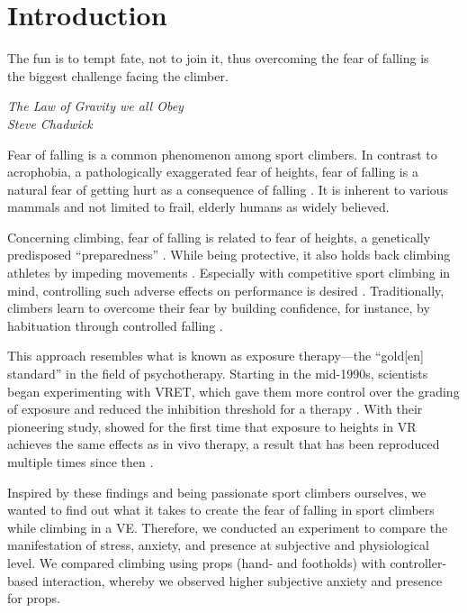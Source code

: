 \section{Introduction}

\epigraph{The fun is to tempt fate, not to join it, thus overcoming the fear of falling is\\the biggest challenge facing the climber.}{\textit{The Law of Gravity we all Obey\\Steve Chadwick}}

Fear of falling is a common phenomenon among sport climbers. In contrast to acrophobia, a pathologically exaggerated fear of heights, fear of falling is a natural fear of getting hurt as a consequence of falling \autocite{Legters2002}. It is inherent to various mammals \autocite{Gibson1960} and not limited to frail, elderly humans \autocite{Suzuki2002} as widely believed.

Concerning climbing, fear of falling is related to fear of heights, a genetically predisposed “preparedness” \autocites{Bertle2014}[based on][]{Armfield2006}. While being protective, it also holds back climbing athletes by impeding movements \autocite{Horst2017}. Especially with competitive sport climbing in mind, controlling such adverse effects on performance is desired \autocite{Hardy2007}. Traditionally, climbers learn to overcome their fear by building confidence, for instance, by habituation through controlled falling \autocite{Lloyd2014}.


This approach resembles what is known as exposure therapy---the “gold[en] standard” in the field of psychotherapy. Starting in the mid-1990s, scientists began experimenting with \gls{VRET}, which gave them more control over the grading of exposure and reduced the inhibition threshold for a therapy \autocite{Powers2008}. With their pioneering study, \textcite{Emmelkamp2001} showed for the first time that exposure to heights in \gls{VR} achieves the same effects as in vivo therapy, a result that has been reproduced multiple times since then \autocite{Powers2008}. 


Inspired by these findings and being passionate sport climbers ourselves, we wanted to find out what it takes to create the fear of falling in sport climbers while climbing in a \gls{VE}. Therefore, we conducted an experiment to compare the manifestation of stress, anxiety, and presence at subjective and physiological level. We compared climbing using props (hand- and footholds) with controller-based interaction, whereby we observed higher subjective anxiety and presence for props. 

